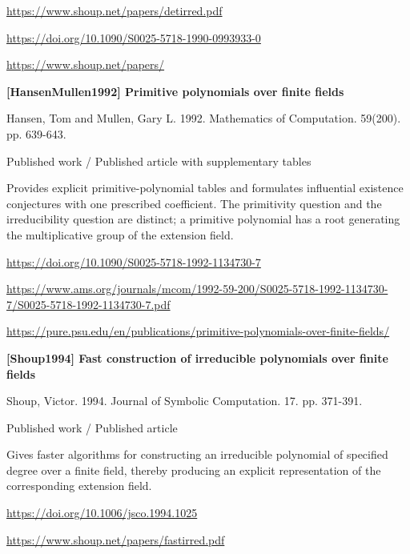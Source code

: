 \documentclass[11pt,a4paper,oneside,openany]{book}
\begin{document}
{\footnotesize\url{https://www.shoup.net/papers/detirred.pdf}}\par
{\footnotesize\url{https://doi.org/10.1090/S0025-5718-1990-0993933-0}}\par
{\footnotesize\url{https://www.shoup.net/papers/}}\par
\vspace{9pt}
\hypertarget{ref:HansenMullen1992}{}
{\sffamily\bfseries\color{atlasgreen}[HansenMullen1992] Primitive polynomials over finite fields}\par
\color{black} Hansen, Tom and Mullen, Gary L. 1992. Mathematics of Computation. 59(200). pp. 639-643.\par
{\small\sffamily\color{atlasgold}Published work / Published article with supplementary tables}\par
\color{black} Provides explicit primitive-polynomial tables and formulates influential existence conjectures with one prescribed coefficient. The primitivity question and the irreducibility question are distinct; a primitive polynomial has a root generating the multiplicative group of the extension field.\par
{\footnotesize\url{https://doi.org/10.1090/S0025-5718-1992-1134730-7}}\par
{\footnotesize\url{https://www.ams.org/journals/mcom/1992-59-200/S0025-5718-1992-1134730-7/S0025-5718-1992-1134730-7.pdf}}\par
{\footnotesize\url{https://pure.psu.edu/en/publications/primitive-polynomials-over-finite-fields/}}\par
\vspace{9pt}
\hypertarget{ref:Shoup1994}{}
{\sffamily\bfseries\color{atlasgreen}[Shoup1994] Fast construction of irreducible polynomials over finite fields}\par
\color{black} Shoup, Victor. 1994. Journal of Symbolic Computation. 17. pp. 371-391.\par
{\small\sffamily\color{atlasgold}Published work / Published article}\par
\color{black} Gives faster algorithms for constructing an irreducible polynomial of specified degree over a finite field, thereby producing an explicit representation of the corresponding extension field.\par
{\footnotesize\url{https://doi.org/10.1006/jsco.1994.1025}}\par
{\footnotesize\url{https://www.shoup.net/papers/fastirred.pdf}}\par
\end{document}
